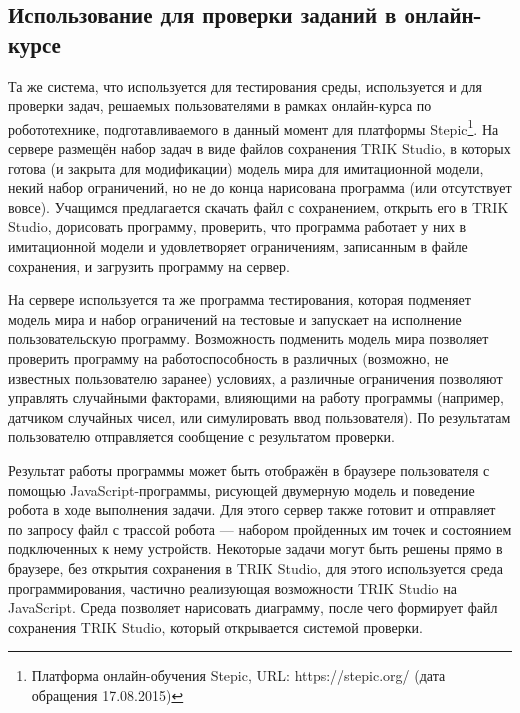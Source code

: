 \documentclass[conference]{IEEEtran}
\begin{document}
\subsection{Использование для проверки заданий в онлайн-курсе}
Та же система, что используется для тестирования среды, используется и для проверки задач, решаемых пользователями 
в рамках онлайн-курса по робототехнике, подготавливаемого в данный момент для платформы Stepic\footnote{Платформа онлайн-обучения Stepic, URL: https://stepic.org/ (дата обращения 17.08.2015)}.
На сервере размещён набор задач в виде файлов сохранения TRIK Studio, в которых готова (и закрыта для модификации) модель 
мира для имитационной модели, некий набор ограничений, но не до конца нарисована программа (или отсутствует вовсе). 
Учащимся предлагается скачать файл с сохранением, открыть его в TRIK Studio, дорисовать программу, проверить, 
что программа работает у них в имитационной модели и удовлетворяет ограничениям, записанным в файле сохранения, 
и загрузить программу на сервер.

На сервере используется та же программа тестирования, которая подменяет модель мира и набор ограничений на тестовые
и запускает на исполнение пользовательскую программу. Возможность подменить модель мира позволяет проверить 
программу на работоспособность в различных (возможно, не известных пользователю заранее) условиях, а различные 
ограничения позволяют управлять случайными факторами, влияющими на работу программы (например, датчиком 
случайных чисел, или симулировать ввод пользователя). По результатам пользователю отправляется сообщение с результатом проверки.

Результат работы программы может быть отображён в браузере пользователя с помощью JavaScript-программы, рисующей 
двумерную модель и поведение робота в ходе выполнения задачи. Для этого сервер также готовит и отправляет по 
запросу файл с трассой робота --- набором пройденных им точек и состоянием подключенных к нему устройств. 
Некоторые задачи могут быть решены прямо в браузере, без открытия сохранения в TRIK Studio, для этого используется 
среда программирования, частично реализующая возможности TRIK Studio на JavaScript. Среда позволяет нарисовать 
диаграмму, после чего формирует файл сохранения TRIK Studio, который открывается системой проверки.
\end{document}
